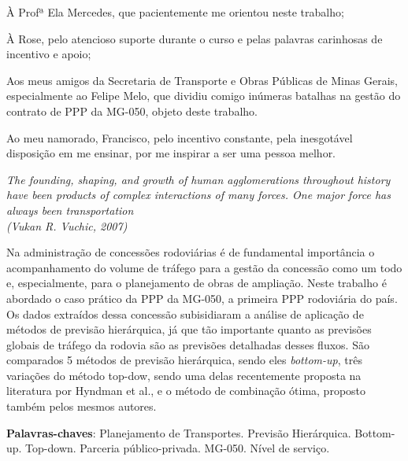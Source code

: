 \documentclass[
	12pt,				%
	openright,			%
	twoside,			%
	a4paper,			%
	english,			%
	french,				%
	spanish,			%
	brazil				%
	]{abntex2}
\begin{document}
\begin{agradecimentos}

À Profª Ela Mercedes, que pacientemente me orientou neste trabalho;

À Rose, pelo atencioso suporte durante o curso e pelas palavras carinhosas de incentivo e apoio;

Aos meus amigos da Secretaria de Transporte e Obras Públicas de Minas Gerais, especialmente ao Felipe Melo, que dividiu comigo inúmeras batalhas na gestão do contrato de PPP da MG-050, objeto deste trabalho.

Ao meu namorado, Francisco, pelo incentivo constante, pela inesgotável disposição em me ensinar, por me inspirar a ser uma pessoa melhor.

\end{agradecimentos}

\begin{epigrafe}
    \vspace*{\fill}
	\begin{flushright}
		\textit{The founding, shaping, and growth of human agglomerations throughout history have been products of complex interactions of many forces. One major force has always been transportation\\
		(Vukan R. Vuchic, 2007)}	
\end{flushright}
\end{epigrafe}


\setlength{\absparsep}{18pt} %
\begin{resumo}

Na administração de concessões rodoviárias é de fundamental importância o acompanhamento do volume de tráfego para a gestão da concessão como um todo e, especialmente, para o planejamento de obras de ampliação. Neste trabalho é abordado o caso prático da PPP da MG-050, a primeira PPP rodoviária do país. Os dados extraídos dessa concessão subisidiaram a análise de aplicação de métodos de previsão hierárquica, já que tão importante quanto as previsões globais de tráfego da rodovia são as previsões detalhadas desses fluxos.
São comparados 5 métodos de previsão hierárquica, sendo eles \emph{bottom-up}, três variações do método top-dow, sendo uma delas recentemente proposta na literatura por Hyndman et al., e o método de combinação ótima, proposto também pelos mesmos autores.


 \textbf{Palavras-chaves}: Planejamento de Transportes. Previsão Hierárquica. Bottom-up. Top-down. Parceria público-privada. MG-050. Nível de serviço.
\end{resumo}
\end{document}
